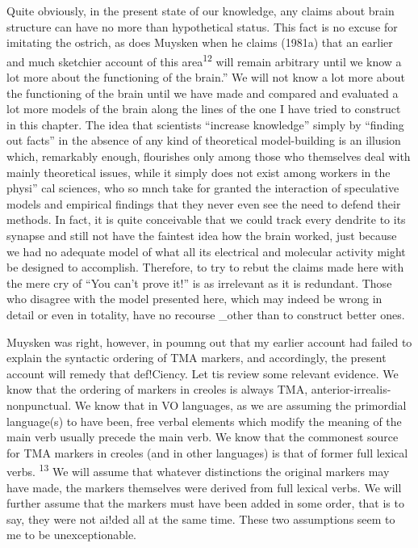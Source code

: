 Quite obviously, in the present state of our knowledge, any claims about brain structure can have no more than hypothetical status. This fact is no excuse for imitating the ostrich, as does Muysken when he claims (1981a) that an earlier and much sketchier account of this area\textsuperscript{12} {\textquotedbl}will remain arbitrary until we know a lot more about the functioning of the brain.'' We will not know a lot more about the functioning of the brain until we have made and compared and evalu\-ated a lot more models of the brain along the lines of the one I have tried to construct in this chapter. The idea that scientists ``increase knowledge'' simply by ``finding out facts'' in the absence of any kind of theoretical model-building is an illusion which, remarkably enough, flourishes only among those who themselves deal with mainly theore\-tical issues, while it simply does not exist among workers in the physi'' cal sciences, who so mnch take for granted the interaction of specula\-tive models and empirical findings that they never even see the need to defend their methods. In fact, it is quite conceivable that we could track every dendrite to its synapse and still not have the faintest idea
how the brain worked, just because we had no adequate model of what all its electrical and molecular activity might be designed to accomplish. Therefore, to try to rebut the claims made here with the mere cry of ``You can't prove it!'' is as irrelevant as it is redundant. Those who disagree with the model presented here, which may indeed be wrong
in detail or even in totality, have no recourse \_other than to construct better ones.

Muysken was right, however, in poumng out that my earlier account had failed to explain the syntactic ordering of TMA markers, and accordingly, the present account will remedy that def!Ciency. Let tis review some relevant evidence. We know that the ordering of mark\-ers in creoles is always TMA, anterior-irrealis-nonpunctual. We know
that in VO languages, as we are assuming the primordial language(s) to have been, free verbal elements which modify the meaning of the main verb usually precede the main verb. We know that the commonest source for TMA markers in creoles (and in other languages) is that of former full lexical verbs. \textsuperscript{13} We will assume that whatever distinctions the original markers may have made, the markers themselves were
derived from full lexical verbs. We will further assume that the markers
must have been added in some order, that is to say, they were not ai!ded all at the same time. These two assumptions seem to me to be unexceptionable.

